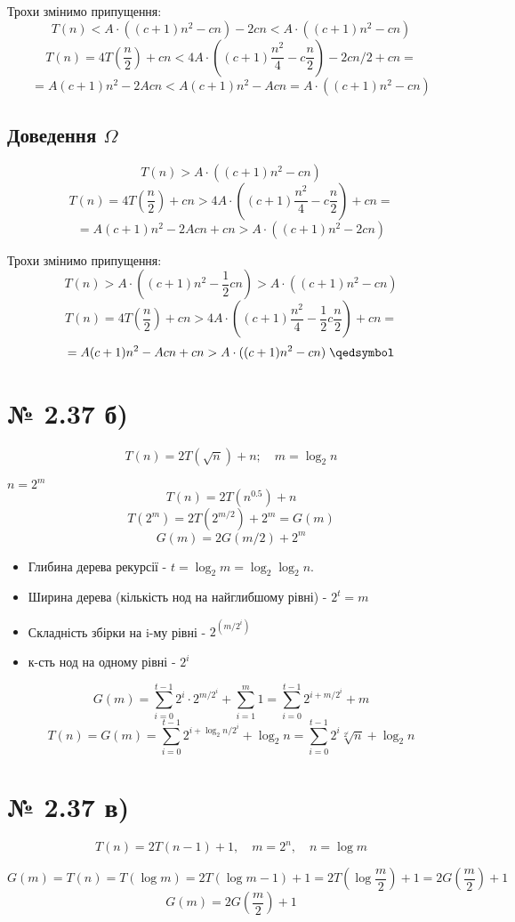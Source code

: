 \documentclass[11pt, a4paper]{article} %
\begin{document}
Трохи змінимо припущення:
$$T(n) < A \cdot ((c+1)n^2 - cn) - 2cn < A \cdot ((c+1)n^2 - cn)$$
$$T(n) = 4T(\frac{n}{2}) + cn < 4A \cdot ((c+1)\frac{n^2}{4} - c\frac{n}{2}) - 2cn/2 + cn = $$
$$= A(c+1)n^2 - 2Acn < A(c+1)n^2 - Acn = A\cdot ((c+1)n^2 - cn)$$
\qedsymbol

\subsection*{Доведення $\Omega$}
$$T(n) > A \cdot ((c+1)n^2 - cn)$$
$$T(n) = 4T(\frac{n}{2}) + cn > 4A \cdot ((c+1)\frac{n^2}{4} - c\frac{n}{2}) + cn = $$
$$= A(c+1)n^2 - 2Acn + cn > A\cdot ((c+1)n^2 - 2cn)$$

Трохи змінимо припущення:
$$T(n) > A \cdot ((c+1)n^2 - \frac{1}{2}cn) >  A \cdot ((c+1)n^2 - cn)$$
$$T(n) = 4T(\frac{n}{2}) + cn > 4A \cdot ((c+1)\frac{n^2}{4} - \frac{1}{2}c\frac{n}{2}) + cn = $$
$$= A(c+1)n^2 - Acn + cn > A\cdot ((c+1)n^2 - cn)\; \qedsymbol$$

\section*{№ 2.37 б)}
$$T(n) = 2T(\sqrt n) + n; \quad m = \log_2 n$$

$n = 2^m$
$$T(n) = 2T(n^{0.5}) + n$$
$$T(2^m) = 2T(2^{m/2}) + 2^m = G(m)$$
$$G(m) = 2G(m/2) + 2^m$$

\begin{itemize}
    \item Глибина дерева рекурсії - $t = \log_2 m = \log_2 \log_2 n$.
    \item Ширина дерева (кількість нод на найглибшому рівні) - $2^t = m$
    \item Складність збірки на i-му рівні - $2^(m/2^i)$
    \item к-сть нод на одному рівні - $2^i$
\end{itemize}

$$G(m) = \sum_{i=0}^{t-1} 2^i \cdot 2^{m/2^i} + \sum_{i=1}^m 1 =  \sum_{i=0}^{t-1}2^{i + m/2^i} + m$$
$$T(n) = G(m) = \sum_{i=0}^{t-1}2^{i + \log_2 n/2^i} + \log_2 n = \sum_{i=0}^{t-1}2^i \sqrt[2^i]{n} + \log_2 n$$

\section*{№ 2.37 в)}
$$T(n) = 2T(n-1) + 1, \quad m = 2^n, \quad n = \log m$$

$$G(m) = T(n) = T(\log m) = 2T(\log m-1) + 1 = 2T(\log \frac{m}{2}) + 1 = 2G(\frac{m}{2}) + 1$$
$$G(m) = 2G(\frac{m}{2}) + 1$$
\end{document}

